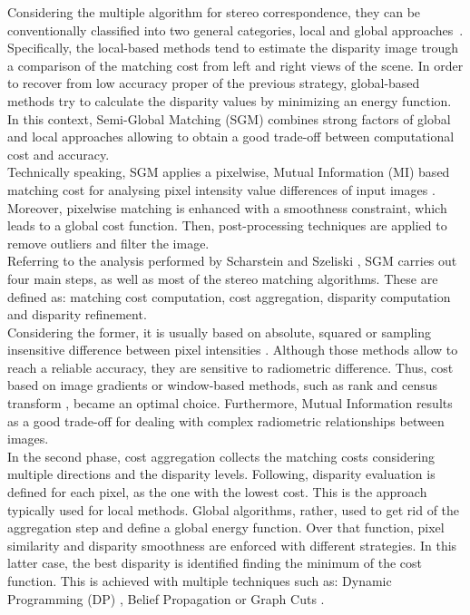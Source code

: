 Considering the multiple algorithm for stereo correspondence, they can be conventionally classified into two general categories, local and global approaches~\cite{Scharstein2001}.
Specifically, the local-based methods tend to estimate the disparity image trough a comparison of the matching cost from left and right views of the scene. 
In order to recover from low accuracy proper of the previous strategy, global-based methods try to calculate the disparity values by minimizing an energy function.
In this context, Semi-Global Matching (SGM) combines strong factors of global and local approaches allowing to obtain a good trade-off between computational cost and accuracy. \\
Technically speaking, SGM applies a pixelwise, Mutual Information (MI) based matching cost for analysing pixel intensity value differences of input images \citep{Hirschmuller2008}.
Moreover, pixelwise matching is enhanced with a smoothness constraint, which leads to a global cost function. 
Then, post-processing techniques are applied to remove outliers and filter the image.\\
Referring to the analysis performed by Scharstein and Szeliski \citep{Scharstein2001}, SGM carries out four main steps, as well as most of the stereo matching algorithms. 
These are defined as: matching cost computation, cost aggregation, disparity computation and disparity refinement. \\
Considering the former, it is usually based on absolute, squared or sampling insensitive difference between pixel intensities \citep{Hirschmuller2008}. Although those methods allow to reach a reliable accuracy, they are sensitive to radiometric difference. 
Thus, cost based on image gradients or window-based methods, such as rank and census transform \citep{Ko2017}, became an optimal choice. 
Furthermore, Mutual Information results as a good trade-off for dealing with complex radiometric relationships between images.\\
In the second phase, cost aggregation collects the matching costs considering multiple directions and the disparity levels. 
Following, disparity evaluation is defined for each pixel, as the one with the lowest cost. This is the approach typically used for local methods. 
Global algorithms, rather, used to get rid of the aggregation step and define a global energy function. 
Over that function, pixel similarity and disparity smoothness are enforced with different strategies. In this latter case, the best disparity is identified finding the minimum of the cost function. This is achieved with multiple techniques such as: Dynamic Programming (DP) \citep{Birchfield1999}, Belief Propagation \citep{Klaus2006} or Graph Cuts \citep{Kolmogorov2001}.\\
